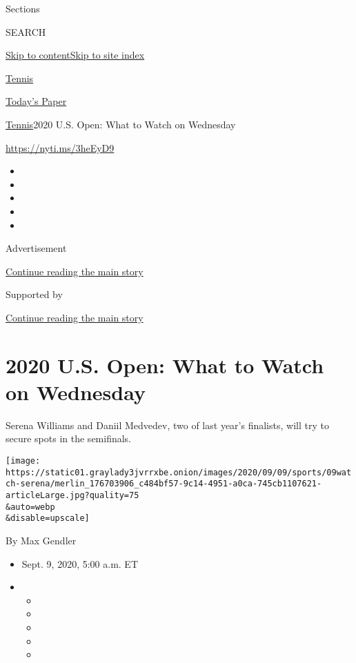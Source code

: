 Sections

SEARCH

\protect\hyperlink{site-content}{Skip to
content}\protect\hyperlink{site-index}{Skip to site index}

\href{https://www.nytimes3xbfgragh.onion/section/sports/tennis}{Tennis}

\href{https://myaccount.nytimes3xbfgragh.onion/auth/login?response_type=cookie\&client_id=vi}{}

\href{https://www.nytimes3xbfgragh.onion/section/todayspaper}{Today's
Paper}

\href{/section/sports/tennis}{Tennis}\textbar{}2020 U.S. Open: What to
Watch on Wednesday

\url{https://nyti.ms/3heEyD9}

\begin{itemize}
\item
\item
\item
\item
\item
\end{itemize}

Advertisement

\protect\hyperlink{after-top}{Continue reading the main story}

Supported by

\protect\hyperlink{after-sponsor}{Continue reading the main story}

\hypertarget{2020-us-open-what-to-watch-on-wednesday}{%
\section{2020 U.S. Open: What to Watch on
Wednesday}\label{2020-us-open-what-to-watch-on-wednesday}}

Serena Williams and Daniil Medvedev, two of last year's finalists, will
try to secure spots in the semifinals.

\texttt{[image: https://static01.graylady3jvrrxbe.onion/images/2020/09/09/sports/09watch-serena/merlin\_176703906\_c484bf57-9c14-4951-a0ca-745cb1107621-articleLarge.jpg?quality=75\\\&auto=webp\\\&disable=upscale]}

By Max Gendler

\begin{itemize}
\item
  Sept. 9, 2020, 5:00 a.m. ET
\item
  \begin{itemize}
  \item
  \item
  \item
  \item
  \item
  \end{itemize}
\end{itemize}

